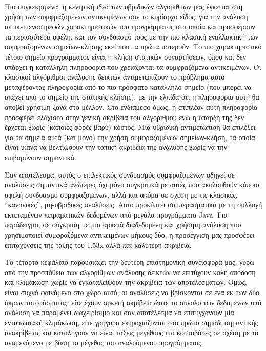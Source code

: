 Πιο συγκεκριμένα, η κεντρική ιδεά των υβριδικών αλγορίθμων μας έγκειται στη χρήση των συμφραζομένων αντικειμένων σαν το κυρίαρχο είδος, για την ανάλυση αντικειμενοστρεφών χαρακτηριστικών του προγράμματος στα οποία και προσφέρουν τα περισσότερα οφέλη, και τον συνδυασμό τους με την πιο κλασική εναλλακτική των συμφραζομένων σημείων-κλήσης εκεί που τα πρώτα υστερούν. Το πιο χαρακτηριστικό τέτοιο σημείο προγράμματος είναι η κλήση στατικών συναρτήσεων, όπου και δεν υπάρχει η κατάλληλη πληροφορία που χρειάζονται τα συμφραζόμενα αντικειμένων. Οι κλασικοί αλγόριθμοι ανάλυσης δεικτών αντιμετωπίζουν το πρόβλημα αυτό μεταφέροντας πληροφορία από το πιο πρόσφατο κατάλληλο σημείο (που μπορεί να απέχει από το σημείο της στατικής κλήσης), με την ελπίδα ότι η πληροφορία αυτή θα αποβεί χρήσιμη ξανά στο μέλλον. Στο ενδιάμεσο όμως, η επιπλέον αυτή πληροφορία προσφέρει ελάχιστα στην γενική ακρίβεια του αλγορίθμου ενώ η ύπαρξη της δεν έρχεται χωρίς (κάποιες φορές βαρύ) κόστος. Μια υβριδική αντιμετώπιση θα επιλέξει για τα σημεία αυτά (και μόνο) την χρήση συμφραζομένων σημείων-κλήση, τα οποία είναι ικανά να βελτιώσουν την τοπική ακρίβεια της ανάλυσης χωρίς να την επιβαρύνουν σημαντικά.

Σαν αποτέλεσμα, αυτός ο επιλεκτικός συνδυασμός συμφραζομένων οδηγεί σε αναλύσεις σημαντικά ανώτερες όχι μόνο συγκριτικά με αυτές που ακολουθούν κάποιο αφελή συνδυασμό συμφραζομένων, αλλά και ακόμα σε σχέση με τις κλασικές, ``κανονικές'', μη-υβριδικές αναλύσεις. Αυτό προκύπτει συμπερασματικά με τη συλλογή εκτεταμένων πειραματικών δεδομένων από μεγάλα προγράμματα {\en Java}. Για παράδειγμα, σε σύγκριση με μία αρκετά διαδεδομένη και χρήσιμη ανάλυση που χρησιμοποιεί συμφραζόμενα αντικειμένων μήκους δύο, η προσέγγιση μας προσφέρει επιταχύνσεις της τάξης του {\en 1.53x} αλλά \emph{και} καλύτερη ακρίβεια.


Το τέταρτο κεφάλαιο παρουσιάζει την δεύτερη επιστημονική συνεισφορά μας, γύρω από την προσπάθεια των αλγορίθμων ανάλυσης δεικτών να επιτύχουν καλή απόδοση και κλιμάκωση χωρίς να εγκαταλείψουν την ακρίβεια των αποτελεσμάτων. Όμως, είναι συχνό φαινόμενο στο χώρο αυτό, οι αναλύσεις να βρίσκονται σε ένα εκ των δύο άκρων του φάσματος: είτε έχουν αρκετή ακρίβεια ώστε το σύνολο των δεδομένων υπό ανάλυση να παραμένει διαχειρίσιμο και σαν αποτέλεσμα να επιτυγχάνουν μία εντυπωσιακή κλιμάκωση, είτε γρήγορα εκτροχιάζονται στο πρώτο σημάδι σημαντικής ανακρίβειας και καταλήγουν να \mbox{είναι} τάξεις μεγέθους πιο κοστοβόρες σε σχέση με το αναμενόμενο με βάση το μέγεθος του αναλυόμενου προγράμματος.

